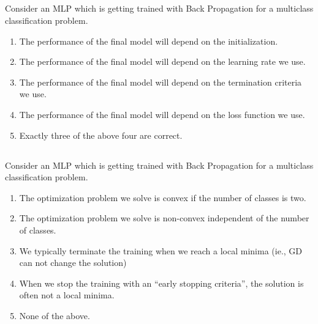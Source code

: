 \begin{frame}
\section{}
Consider an MLP which is getting trained with Back Propagation for a multiclass classification problem.

\begin{enumerate}[label=(\Alph*)]
\item The performance of the final model will depend on the initialization.   %
\item The performance of the final model will depend on the learning rate we use.   %
\item The performance of the final model will depend on the termination criteria we use.    %
\item The performance of the final model will depend on the loss function we use.   %
\item Exactly three of the above four are correct.   %
\end{enumerate}

\end{frame}

\begin{frame}
\section{}
Consider an MLP which is getting trained with Back Propagation for a multiclass classification problem.


\begin{enumerate}[label=(\Alph*)]
\item The optimization problem we solve is convex if the number of classes is  two.
\item The optimization problem we solve is non-convex independent of the number of classes.   %
\item We typically terminate the training when we reach a local minima (ie., GD can not change the solution)    %
\item When we stop the training with an ``early stopping criteria'', the solution is often not a local minima.    %
\item None of the above.   %
\end{enumerate}
\end{frame}
